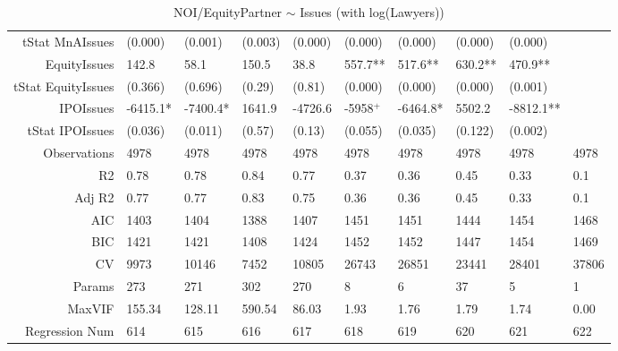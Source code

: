 \begin{table}[ht]
\begin{tabular}{rlllllllll}
  tStat MnAIssues & (0.000) & (0.001) & (0.003) & (0.000) & (0.000) & (0.000) & (0.000) & (0.000) &  \\ 
  EquityIssues & 142.8 & 58.1 & 150.5 & 38.8 & 557.7** & 517.6** & 630.2** & 470.9** &  \\ 
  tStat EquityIssues & (0.366) & (0.696) & (0.29) & (0.81) & (0.000) & (0.000) & (0.000) & (0.001) &  \\ 
  IPOIssues & -6415.1* & -7400.4* & 1641.9 & -4726.6 & -5958$^{+}$ & -6464.8* & 5502.2 & -8812.1** &  \\ 
  tStat IPOIssues & (0.036) & (0.011) & (0.57) & (0.13) & (0.055) & (0.035) & (0.122) & (0.002) &  \\ 
  Observations & 4978 & 4978 & 4978 & 4978 & 4978 & 4978 & 4978 & 4978 & 4978 \\ 
  R2 & 0.78 & 0.78 & 0.84 & 0.77 & 0.37 & 0.36 & 0.45 & 0.33 & 0.1 \\ 
  Adj R2 & 0.77 & 0.77 & 0.83 & 0.75 & 0.36 & 0.36 & 0.45 & 0.33 & 0.1 \\ 
  AIC & 1403 & 1404 & 1388 & 1407 & 1451 & 1451 & 1444 & 1454 & 1468 \\ 
  BIC & 1421 & 1421 & 1408 & 1424 & 1452 & 1452 & 1447 & 1454 & 1469 \\ 
  CV & 9973 & 10146 & 7452 & 10805 & 26743 & 26851 & 23441 & 28401 & 37806 \\ 
  Params & 273 & 271 & 302 & 270 & 8 & 6 & 37 & 5 & 1 \\ 
  MaxVIF & 155.34 & 128.11 & 590.54 & 86.03 & 1.93 & 1.76 & 1.79 & 1.74 & 0.00 \\ 
  Regression Num & 614 & 615 & 616 & 617 & 618 & 619 & 620 & 621 & 622 \\ 
   \hline
\end{tabular}
\caption{NOI/EquityPartner $\sim$ Issues (with log(Lawyers))} 
\end{table}
